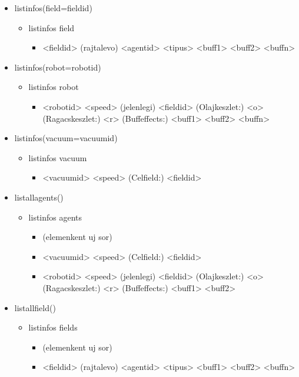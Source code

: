 \begin{itemize}
	\item listinfos(field=fieldid)
	\begin{itemize}
		\item listinfos field
		\begin{itemize}
			\item <fieldid> (rajtalevo) <agentid> <tipus> <buff1> <buff2> <buffn> 
		\end{itemize}
	\end{itemize}	
	
	\item listinfos(robot=robotid)
	\begin{itemize}
		\item listinfos robot
		\begin{itemize}
			\item <robotid> <speed> (jelenlegi) <fieldid> (Olajkeszlet:) <o> (Ragacskeszlet:) <r> (Buffeffects:) <buff1> <buff2> <buffn> 
		\end{itemize}
	\end{itemize}	
	
	\item listinfos(vacuum=vacuumid)
	\begin{itemize}
		\item listinfos vacuum
		\begin{itemize}
			\item <vacuumid> <speed> (Celfield:) <fieldid>
		\end{itemize}
	\end{itemize}		
	
	\item listallagents()
	\begin{itemize}
		\item listinfos agents
		\begin{itemize}
			\item (elemenkent uj sor)
			\item <vacuumid> <speed> (Celfield:) <fieldid>
			\item <robotid> <speed> (jelenlegi) <fieldid> (Olajkeszlet:) <o> (Ragacskeszlet:) <r> (Buffeffects:) <buff1> <buff2>
		\end{itemize}
	\end{itemize}	
	
	\item listallfield()
	\begin{itemize}
		\item listinfos fields
		\begin{itemize}
			\item (elemenkent uj sor)			
			\item <fieldid> (rajtalevo) <agentid> <tipus> <buff1> <buff2> <buffn> 
		\end{itemize}
	\end{itemize}	
	
	
\end{itemize}


